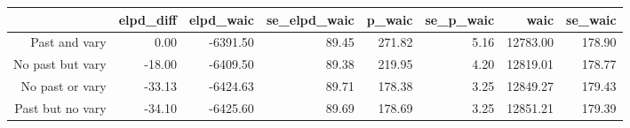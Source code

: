 \begin{table}[ht]
\centering
\begin{tabular}{rrrrrrrr}
  \hline
 & elpd\_diff & elpd\_waic & se\_elpd\_waic & p\_waic & se\_p\_waic & waic & se\_waic \\ 
  \hline
Past and vary & 0.00 & -6391.50 & 89.45 & 271.82 & 5.16 & 12783.00 & 178.90 \\ 
  No past but vary & -18.00 & -6409.50 & 89.38 & 219.95 & 4.20 & 12819.01 & 178.77 \\ 
  No past or vary & -33.13 & -6424.63 & 89.71 & 178.38 & 3.25 & 12849.27 & 179.43 \\ 
  Past but no vary & -34.10 & -6425.60 & 89.69 & 178.69 & 3.25 & 12851.21 & 179.39 \\ 
   \hline
\end{tabular}
\end{table}
